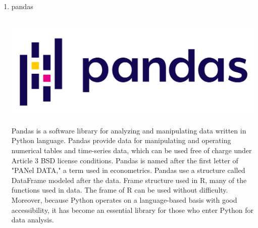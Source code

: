 \documentclass[conference]{IEEEtran}
\begin{document}
\begin{enumerate}
 \break    
    
    \item pandas \\ \\
    \centerline{\includegraphics[scale=0.2]{assets/pandas.PNG}}
    Pandas is a software library for analyzing and manipulating data written in Python language. Pandas provide data for manipulating and operating numerical tables and time-series data, which can be used free of charge under Article 3 BSD license conditions. Pandas is named after the first letter of "PANel DATA," a term used in econometrics. Pandas use a structure called DataFrame modeled after the data. Frame structure used in R, many of the functions used in data. The frame of R can be used without difficulty. Moreover, because Python operates on a language-based basis with good accessibility, it has become an essential library for those who enter Python for data analysis. \\ \\ \\ \\ \\ \\ \\ \\ \\ \\ \\ 
    

\end{enumerate}
\end{document}
